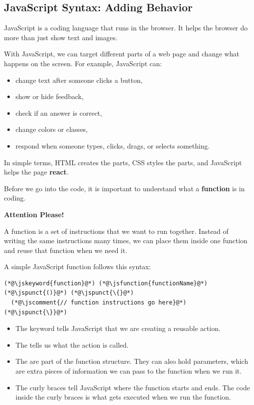 \documentclass{article}
\begin{document}
\subsection*{\Bitter\textcolor{naranja}{JavaScript Syntax: Adding Behavior}}
\label{subsec:javascript-syntax}

JavaScript is a coding language that runs in the browser.
It helps the browser do more than just show text and images.

With JavaScript, we can target different parts of a web page and change what happens on the screen.
For example, JavaScript can:

\begin{itemize}
  \item change text after someone clicks a button,
  \item show or hide feedback,
  \item check if an answer is correct,
  \item change colors or classes,
  \item respond when someone types, clicks, drags, or selects something.
\end{itemize}

In simple terms, HTML creates the parts, CSS styles the parts, and JavaScript helps the page \textbf{react}.
\vspace{0.3cm}

Before we go into the code, it is important to understand what a \textbf{function} is in coding.

\begin{attentionbox}
  \textbf{\Bitter\textcolor{naranja}{Attention Please!}}

  A function is a set of instructions that we want to run together.
  Instead of writing the same instructions many times, we can place them inside one function and reuse that function when we need it.
\end{attentionbox}

A simple JavaScript function follows this syntax:

\begin{lstlisting}
(*@\jskeyword{function}@*) (*@\jsfunction{functionName}@*)(*@\jspunct{()}@*) (*@\jspunct{\{}@*)
  (*@\jscomment{// function instructions go here}@*)
(*@\jspunct{\}}@*)
\end{lstlisting}

\begin{itemize}
  \item The  keyword tells JavaScript that we are creating a reusable action.
  \item The  tells us what the action is called.
  \item The \inlinejsmethod{()} are part of the function structure. They can also hold parameters, which are extra pieces of information we can pass to the function when we run it.
  \item The curly braces \inlinejsmethod{\{\}} tell JavaScript where the function starts and ends. The code inside the curly braces is what gets executed when we run the function.
\end{itemize}
\end{document}

